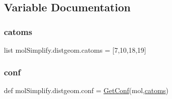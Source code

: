 \subsection{Variable Documentation}
\mbox{\label{namespacemolSimplify_1_1distgeom_a3aab6d25e8f34a4b314e6ae3e33b5655}} 
\subsubsection{\texorpdfstring{catoms}{catoms}}
{\footnotesize\ttfamily list mol\+Simplify.\+distgeom.\+catoms = \mbox{[}7,10,18,19\mbox{]}}

\mbox{\label{namespacemolSimplify_1_1distgeom_afe6a1a0b7b2279c05a6fd4ddd6364057}} 
\subsubsection{\texorpdfstring{conf}{conf}}
{\footnotesize\ttfamily def mol\+Simplify.\+distgeom.\+conf = \hyperlink{namespacemolSimplify_1_1distgeom_a4e88fd4f6eafcb693dfcc7cba4ee42a7}{Get\+Conf}(mol,\hyperlink{namespacemolSimplify_1_1distgeom_a3aab6d25e8f34a4b314e6ae3e33b5655}{catoms})}

